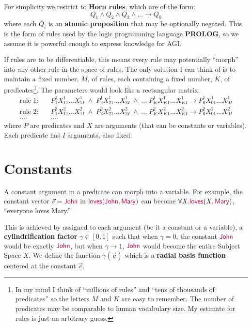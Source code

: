 For simplicity we restrict to \textbf{Horn rules}, which are of the form:
\begin{equation}
Q_1 \wedge Q_2 \wedge Q_3 \wedge ... \rightarrow Q_0
\end{equation}
where each $Q_i$ is an \textbf{atomic proposition} that may be optionally negated.  This is the form of rules used by the logic programming language \textbf{PROLOG}, so we assume it is powerful enough to express knowledge for AGI.

If rules are to be differentiable, this means every rule may potentially ``morph'' into any other rule in the space of rules.  The only solution I can think of is to maintain a fixed number, $M$, of rules, each containing a fixed number, $K$, of predicates\footnote{In my mind I think of ``millions of rules'' and ``tens of thousands of predicates'' so the letters $M$ and $K$ are easy to remember.  The number of predicates may be comparable to human vocabulary size.  My estimate for rules is just an arbitrary guess.}.  The parameters would look like a rectangular matrix:
\begin{equation}
\begin{aligned}
	\mbox{rule 1:} & \quad \boxed{P^1_{1} X^1_{11}... X^1_{1I}} \;\wedge\; \boxed{P^1_2 X^1_{21} ... X^1_{2I}} \;\wedge\;...\; \boxed{P^1_K X^1_{K1} ... X^1_{KI}} \rightarrow \boxed{P^1_0 X^1_{01} ... X^1_{0I}} \\
	\mbox{rule 2:} & \quad \boxed{P^2_{1} X^2_{11}... X^2_{1I}} \;\wedge\; \boxed{P^2_2 X^2_{21} ... X^2_{2I}} \;\wedge\;...\; \boxed{P^2_K X^2_{K1} ... X^2_{KI}} \rightarrow \boxed{P^2_0 X^2_{01} ... X^2_{0I}} \\
	.... & \quad ....
\end{aligned}
\end{equation}
where $P$ are predicates and $X$ are arguments (that can be constants or variables).  Each predicate has $I$ arguments, also fixed.

\section{Constants}

A constant argument in a predicate can morph into a variable.  For example, the constant vector $\vec{c} = {\color{purple}\mathsf{John}}$ in ${\color{purple}\mathsf{loves(John,Mary)}}$ can become $\forall X. {\color{purple}\mathsf{loves}}(X,{\color{purple}\mathsf{Mary}})$, ``everyone loves Mary.''

This is achieved by assigned to each argument (be it a constant or a variable), a \textbf{cylindrification factor} $\gamma \in [0,1]$ such that when $\gamma = 0$, the constant ${\color{purple}\mathsf{John}}$ would be exactly ${\color{purple}\mathsf{John}}$, but when $\gamma \rightarrow 1$, ${\color{purple}\mathsf{John}}$ would become the entire Subject Space $X$.  We define the function $\gamma(\vec{c})$ which is a \textbf{radial basis function} centered at the constant $\vec{c}$.

